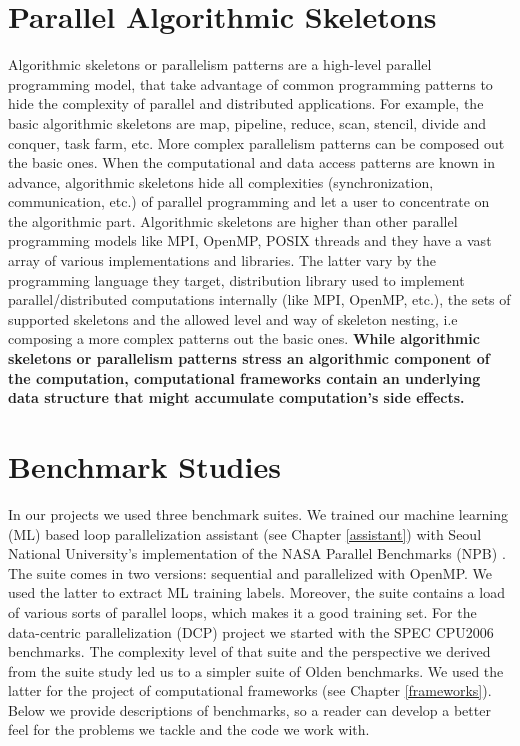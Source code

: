 \section{Parallel Algorithmic Skeletons}
\quad Algorithmic skeletons or parallelism patterns \cite{mccool-patterns} are a high-level parallel programming model, that take advantage of common programming patterns to hide the complexity of parallel and distributed applications. For example, the basic algorithmic skeletons are map, pipeline, reduce, scan, stencil, divide and conquer, task farm, etc. More complex parallelism patterns can be composed out the basic ones. When the computational and data access patterns are known in advance, algorithmic skeletons hide all complexities (synchronization, communication, etc.) of parallel programming and let a user to concentrate on the algorithmic part. Algorithmic skeletons are higher than other parallel programming models like MPI, OpenMP, POSIX threads and they have a vast array of various implementations and libraries. The latter vary by the programming language they target, distribution library used to implement parallel/distributed computations internally (like MPI, OpenMP, etc.), the sets of supported skeletons and the allowed level and way of skeleton nesting, i.e composing a more complex patterns out the basic ones.
\textbf{While algorithmic skeletons or parallelism patterns stress an algorithmic component of the computation, computational frameworks contain an underlying data structure that might accumulate computation's side effects.}
\section{Benchmark Studies}
\label{background_benchmarks}
\quad In our projects we used three benchmark suites. We trained our machine learning (ML) based loop parallelization assistant \cite{assistant-aiseps} (see Chapter \ref{assistant}) with Seoul National University's implementation \cite{snu-npb-benchmarks} of the NASA Parallel Benchmarks (NPB) \cite{snu-npb-benchmarks}. The suite comes in two versions: sequential and parallelized with OpenMP. We used the latter to extract ML training labels. Moreover, the suite contains a load of various sorts of parallel loops, which makes it a good training set. For the data-centric parallelization (DCP) project we started with the SPEC CPU2006 benchmarks. The complexity level of that suite and the perspective we derived from the suite study led us to a simpler suite of Olden benchmarks. We used the latter for the project of computational frameworks (see Chapter \ref{frameworks}). Below we provide descriptions of benchmarks, so a reader can develop a better feel for the problems we tackle and the code we work with.
